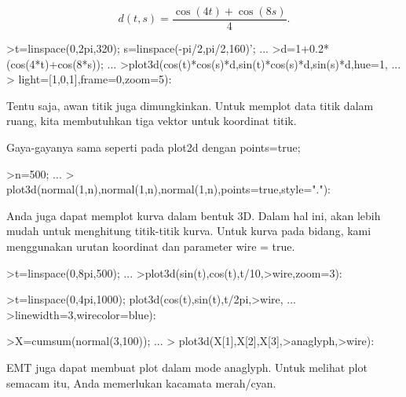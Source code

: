 \documentclass[a4paper,10pt]{article}
\begin{document}
\begin{eulernotebook}
\begin{eulercomment}
\begin{eulercomment}
\begin{eulercomment}
\begin{eulercomment}
\begin{eulercomment}
\begin{eulercomment}
\begin{eulercomment}
\begin{eulercomment}
\begin{eulercomment}
\begin{eulercomment}
\begin{eulercomment}
\end{eulercomment}
\begin{eulerformula}
\[
d(t,s) = \frac{\cos(4t)+\cos(8s)}{4}.
\]
\end{eulerformula}
\begin{eulerprompt}
>t=linspace(0,2pi,320); s=linspace(-pi/2,pi/2,160)'; ...
>d=1+0.2*(cos(4*t)+cos(8*s)); ...
>plot3d(cos(t)*cos(s)*d,sin(t)*cos(s)*d,sin(s)*d,hue=1, ...
>  light=[1,0,1],frame=0,zoom=5):
\end{eulerprompt}
\begin{eulercomment}
Tentu saja, awan titik juga dimungkinkan. Untuk memplot data titik
dalam ruang, kita membutuhkan tiga vektor untuk koordinat titik.

Gaya-gayanya sama seperti pada plot2d dengan points=true;
\end{eulercomment}
\begin{eulerprompt}
>n=500;  ...
>  plot3d(normal(1,n),normal(1,n),normal(1,n),points=true,style="."):
\end{eulerprompt}
\begin{eulercomment}
Anda juga dapat memplot kurva dalam bentuk 3D. Dalam hal ini, akan
lebih mudah untuk menghitung titik-titik kurva. Untuk kurva pada
bidang, kami menggunakan urutan koordinat dan parameter wire = true.
\end{eulercomment}
\begin{eulerprompt}
>t=linspace(0,8pi,500); ...
>plot3d(sin(t),cos(t),t/10,>wire,zoom=3):
\end{eulerprompt}
\begin{eulerprompt}
>t=linspace(0,4pi,1000); plot3d(cos(t),sin(t),t/2pi,>wire, ...
>linewidth=3,wirecolor=blue):
\end{eulerprompt}
\begin{eulerprompt}
>X=cumsum(normal(3,100)); ...
> plot3d(X[1],X[2],X[3],>anaglyph,>wire):
\end{eulerprompt}
\begin{eulercomment}
EMT juga dapat membuat plot dalam mode anaglyph. Untuk melihat plot
semacam itu, Anda memerlukan kacamata merah/cyan.
\end{eulercomment}
\begin{eulerprompt}

\end{eulerprompt}
\end{eulercomment}
\end{eulercomment}
\end{eulercomment}
\end{eulercomment}
\end{eulercomment}
\end{eulercomment}
\end{eulercomment}
\end{eulercomment}
\end{eulercomment}
\end{eulercomment}
\end{eulernotebook}
\end{document}
